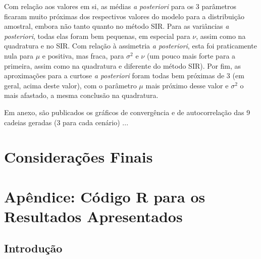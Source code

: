 \documentclass[12pt,reqno,a4paper,oneside]{article}
\begin{document}
Com relação aos valores em si, as médias \textit{a posteriori} para os 3 parâmetros ficaram muito próximas dos respectivos valores do modelo para a distribuição amostral, embora não tanto quanto no método SIR. Para as variâncias \textit{a posteriori}, todas elas foram bem pequenas, em especial para $\nu$, assim como na quadratura e no SIR. Com relação à assimetria \textit{a posteriori}, esta foi praticamente nula para $\mu$ e positiva, mas fraca, para $\sigma^2$ e $\nu$ (um pouco mais forte para a primeira, assim como na quadratura e diferente do método SIR). Por fim, as aproximações para a curtose \textit{a posteriori} foram todas bem próximas de 3 (em geral, acima deste valor), com o parâmetro $\mu$ mais próximo desse valor e $\sigma^2$ o mais afastado, a mesma conclusão na quadratura.

Em anexo, são publicados os gráficos de convergência e de autocorrelação das 9 cadeias geradas (3 para cada cenário) ...


\section{Considerações Finais}\label{consfin}





\newpage

\section*{Apêndice: Código R para os Resultados Apresentados}

\subsection*{Introdução}
\end{document}
